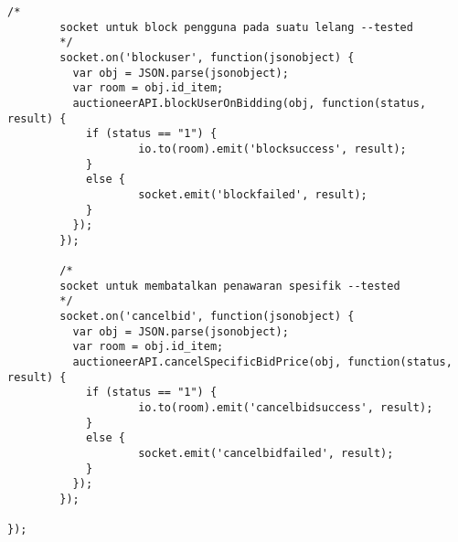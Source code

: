 \begin{lstlisting}[label=sc-socket-bid,style=htmlcssjs,caption=Kode Sumber Implementasi Node.js + Socket.io untuk Lelang]
        /*
        socket untuk block pengguna pada suatu lelang --tested
        */
        socket.on('blockuser', function(jsonobject) {
          var obj = JSON.parse(jsonobject);
          var room = obj.id_item;
          auctioneerAPI.blockUserOnBidding(obj, function(status, result) {
            if (status == "1") {
                    io.to(room).emit('blocksuccess', result);
            }
            else {
                    socket.emit('blockfailed', result);
            }
          });
        });

        /*
        socket untuk membatalkan penawaran spesifik --tested
        */
        socket.on('cancelbid', function(jsonobject) {
          var obj = JSON.parse(jsonobject);
          var room = obj.id_item;
          auctioneerAPI.cancelSpecificBidPrice(obj, function(status, result) {
            if (status == "1") {
                    io.to(room).emit('cancelbidsuccess', result);
            }
            else {
                    socket.emit('cancelbidfailed', result);
            }
          });
        });

});

\end{lstlisting}